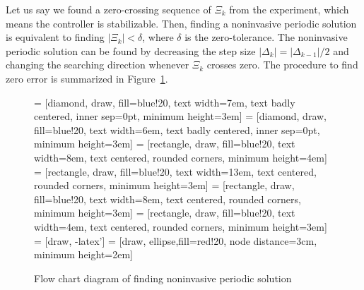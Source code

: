\documentclass[openacc]{rsproca_new}%
\theoremstyle{own}
\newcommand{\Fref}[1]{Figure~\ref{#1}}
\begin{document}
Let us say we found a zero-crossing sequence of $\Xi_k$ from the experiment, which means the controller is stabilizable. Then, finding a noninvasive periodic solution is equivalent to finding  $|\Xi_k|<\delta$, where $\delta$ is the zero-tolerance. The noninvasive periodic solution can be found by decreasing the step size $|\Delta_k|=|\Delta_{k-1}|/2$ and changing the searching direction whenever $\Xi_k$ crosses zero. The procedure to find zero error is summarized in \Fref{f:1}.

\begin{figure}
 = [diamond, draw, fill=blue!20,
    text width=7em, text badly centered, inner sep=0pt, minimum height=3em]
 = [diamond, draw, fill=blue!20,
        text width=6em, text badly centered, inner sep=0pt, minimum height=3em]
 = [rectangle, draw, fill=blue!20,
    text width=8em, text centered, rounded corners, minimum height=4em]
 = [rectangle, draw, fill=blue!20,
        text width=13em, text centered, rounded corners, minimum height=3em]
 = [rectangle, draw, fill=blue!20,
                text width=8em, text centered, rounded corners, minimum height=3em]
 = [rectangle, draw, fill=blue!20,
                text width=4em, text centered, rounded corners, minimum height=3em]
 = [draw, -latex']
 = [draw, ellipse,fill=red!20, node distance=3cm,
    minimum height=2em]

\begin{center}
\end{center}
\centering
\caption{Flow chart diagram of finding noninvasive periodic solution}
\label{f:1}
\end{figure}
\end{document}

